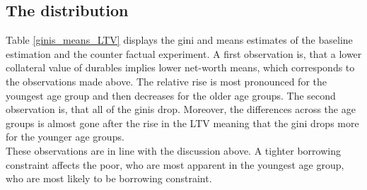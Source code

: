 \documentclass[12pt,a4paper,leqno]{article}
\theoremstyle{definition}
\begin{document}
\subsection{The distribution}
Table \ref{ginis_means_LTV} displays the gini and means estimates of the baseline estimation and the counter factual experiment. A first observation is, that a lower collateral value of durables implies lower net-worth means, which corresponds to the observations made above. The relative rise is most pronounced for the youngest age group and then decreases for the older age groups. 
The second observation is, that all of the ginis drop. Moreover, the differences across the age groups is almost gone after the rise in the LTV meaning that the gini drops more for the younger age groups. \\ These observations are in line with the discussion above. A tighter borrowing constraint affects the poor, who are most apparent in the youngest age group, who are most likely to be borrowing constraint. 
\end{document}
